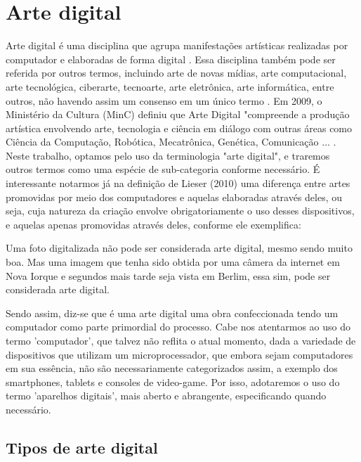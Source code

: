 \section{Arte digital}
\label{sec:arte digital}
Arte digital é uma disciplina que agrupa manifestações artísticas realizadas por computador e elaboradas de forma digital \cite{Lieser}. Essa disciplina também pode ser referida por outros termos, incluindo arte de novas mídias, arte computacional, arte tecnológica, ciberarte, tecnoarte, arte eletrônica, arte informática, entre outros, não havendo assim um consenso em um único termo \cite{Gobira, Arantes}.  Em 2009, o Ministério da Cultura (MinC) definiu que Arte Digital "compreende a produção artística envolvendo arte, tecnologia e ciência em diálogo com outras áreas como Ciência da Computação, Robótica, Mecatrônica, Genética, Comunicação ... \cite{MINC}. Neste trabalho, optamos pelo uso da terminologia "arte digital", e traremos outros termos como uma espécie de sub-categoria conforme necessário. É interessante notarmos já na definição de Lieser (2010) uma diferença entre artes promovidas por meio dos computadores e aquelas elaboradas através deles, ou seja, cuja natureza da criação envolve obrigatoriamente o uso desses dispositivos, e aquelas apenas promovidas através deles, conforme ele exemplifica:

\begin{citacao}
Uma foto digitalizada não pode ser considerada arte digital, mesmo sendo muito boa. Mas uma imagem que tenha sido obtida por uma câmera da internet em Nova Iorque e segundos mais tarde seja vista em Berlim, essa sim, pode ser considerada arte digital. \cite{Lieser}	
\end{citacao}


Sendo assim, diz-se que é uma arte digital uma obra confeccionada tendo um computador como parte primordial do processo. Cabe nos atentarmos ao uso do termo 'computador', que talvez não reflita o atual momento, dada a variedade de dispositivos que utilizam um microprocessador, que embora sejam computadores em sua essência, não são necessariamente categorizados assim, a exemplo dos smartphones, tablets e consoles de video-game. Por isso, adotaremos o uso do termo 'aparelhos digitais', mais aberto e abrangente, especificando quando necessário.


\subsection{Tipos de arte digital}
\label{subsec: formas de arte digital}

